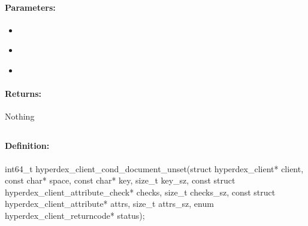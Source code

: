 \paragraph{Parameters:}
\begin{itemize}[noitemsep]
\item {}\\

\item {}\\

\item {}\\

\end{itemize}

\paragraph{Returns:}
Nothing
\pagebreak
\subsection{}
\label{api:c:cond_document_unset}


\paragraph{Definition:}
\begin{ccode}
int64_t hyperdex_client_cond_document_unset(struct hyperdex_client* client,
        const char* space,
        const char* key, size_t key_sz,
        const struct hyperdex_client_attribute_check* checks, size_t checks_sz,
        const struct hyperdex_client_attribute* attrs, size_t attrs_sz,
        enum hyperdex_client_returncode* status);
\end{ccode}


